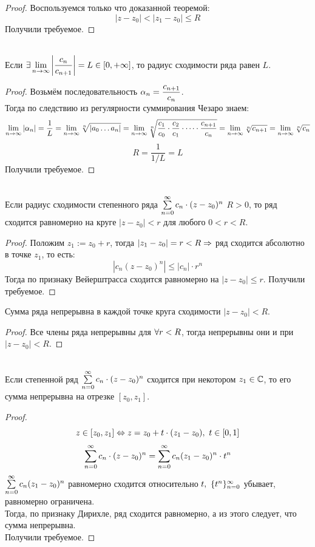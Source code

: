 \begin{proof}
	Воспользуемся только что доказанной теоремой:
	\[|z-z_0|<|z_1-z_0|\le R\]
	Получили требуемое.
\end{proof}
\begin{theorem}\label{17_th2}\\
	Если $\ds\ex\lim_{n\ra\i}\l|\frac{c_n}{c_{n+1}}\r|=L\in[0,+\i]$, то радиус сходимости ряда равен $L$.
\end{theorem}
\begin{proof}
	Возьмём последовательность $\displaystyle\alpha_n=\frac{c_{n+1}}{c_n}$.\\
	Тогда по следствию из регулярности суммирования Чезаро знаем:
	\[\lim_{n\ra\i}\l|\al_n\r|=\frac1L=\lim_{n\ra\i}\sqrt[n]{|a_0\dots a_n|}=\lim_{n\ra\i}\sqrt[n]{\frac{c_1}{c_0}\cdot\frac{c_2}{c_1}\cdot\dots\cdot\frac{c_{n+1}}{c_n}}=\lim_{n\ra\i}\sqrt[n]{c_{n+1}}=\lim_{n\ra\i}\sqrt[n]{c_n}\]
	\[R=\frac{1}{1/L}=L\]
	Получили требуемое.
\end{proof}
\begin{theorem}\label{17_th3}\\
	Если радиус сходимости степенного ряда $\sssc$ $R>0$, то ряд сходится равномерно на круге $|z-z_0|<r$ для любого $0<r<R$.
\end{theorem}
\begin{proof}
	Положим $z_1:=z_0+r$, тогда $|z_1-z_0|=r<R\Rightarrow$ ряд сходится абсолютно в точке $z_1$, то есть:
	\[|c_n(z-z_0)^n|\le|c_n|\cdot r^n\]
	Тогда по признаку Вейерштрасса сходится равномерно на $|z-z_0|\le r$.
	Получили требуемое.
\end{proof}
\begin{corollary}
	Сумма ряда непрерывна в каждой точке круга сходимости $|z-z_0|<R$.
\end{corollary}
\begin{proof}
	Все члены ряда непрерывны для $\forall r<R$, тогда непрерывны они и при $|z-z_0|<R$.
\end{proof}
\begin{theorem}\label{17_th4}\\
	Если степенной ряд $\sssc$ сходится при некотором $z_1\in\mathbb C$, то его сумма непрерывна на отрезке $[z_0,z_1]$.
\end{theorem}
\begin{proof}
	\[z\in[z_0,z_1]\Leftrightarrow z=z_0+t\cdot(z_1-z_0),\ t\in[0,1]\]
	\[\sssc=\ss[0]c_n(z_1-z_0)^n\cdot t^n\]
	$\ss[0]c_n(z_1-z_0)^n$ равномерно сходится относительно $t,\ \{t^n\}_{n=0}^\i$ убывает, равномерно ограничена.\\
	Тогда, по признаку Дирихле, ряд сходится равномерно, а из этого следует, что сумма непрерывна.\\
	Получили требуемое.
\end{proof}
